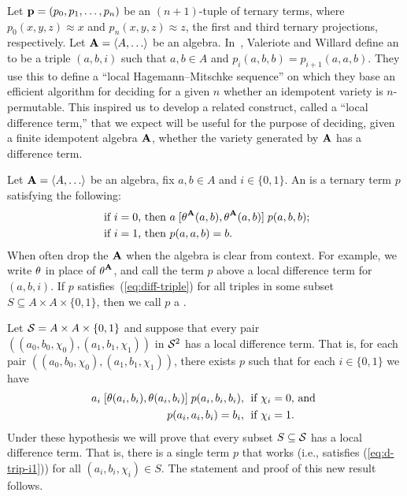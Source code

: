 Let $\mathbf{p} = (p_0, p_1, \dots, p_n)$ be an $(n+1)$-tuple of ternary terms, where
$p_0(x,y,z) \approx x$ and $p_n(x,y,z) \approx z$, the first and third
ternary projections, respectively. 
Let $\bA=\< A, \dots\>$ be an algebra.
In~\cite{MR3239624},
Valeriote and Willard define an 
to be a triple $(a,b,i)$ such that $a, b \in A$ and
$p_i(a,b,b) = p_{i+1}(a,a,b)$. They use this to define 
a ``local Hagemann–Mitschke sequence'' on which they base an efficient algorithm
for deciding for a given $n$ whether an idempotent variety is $n$-permutable.
This inspired us to develop a related construct, called
a ``local difference term,'' that we expect will be useful for the
purpose of deciding, given a finite idempotent algebra $\mathbf{A}$, whether the variety
generated by $\mathbf{A}$ has a difference term.

Let $\bA=\< A, \dots\>$ be an algebra, fix $a, b \in A$ and
$i \in \{0,1\}$.
An
 is a ternary term $p$ satisfying the following:
\begin{align}
\text{ if $i=0$, then } & a \comm{\Cg^{\bA}(a,b)}{\Cg^{\bA}(a,b)} p(a,b,b); \label{eq:diff-triple}\\
\text{ if $i=1$, then } &p(a,a,b) = b. \nonumber
\end{align}
When often drop the
$\mathbf{A}$ when the algebra is clear from context.
For example, we write $\operatorname{\theta}$ in place of $\operatorname{\theta}^{\mathbf{A}}$, and 
call the term $p$ above a local difference term for 
$(a,b,i)$.
If $p$ satisfies~(\ref{eq:diff-triple}) for all triples
in some subset $S\subseteq A \times A \times \{0,1\}$, then we call $p$
a .

Let 
$\mathcal{S} = A \times A \times \{0,1\}$ and
suppose that every pair
$((a_0, b_0, \chi_0), (a_1, b_1, \chi_1))$
in $\mathcal{S}^2$ has a local difference term.
That is, for each pair $((a_0, b_0, \chi_0), (a_1, b_1, \chi_1))$, there exists
$p$ such that for each $i \in \{0,1\}$ we have
\begin{align}
  a_i \comm{\Cg(a_i,b_i)}{\Cg(a_i,b_i)} p(a_i,b_i,b_i), & \;
  \text{ if $\chi_i=0$, and }  \label{eq:d-trip-i1}\\
  p(a_i,a_i,b_i) =b_i, & \;
  \text{ if $\chi_i=1$.}\nonumber
\end{align}
Under these hypothesis we will prove that every subset $S\subseteq \mathcal{S}$
has a local difference term.
That is, there is a single term $p$ that works (i.e., satisfies
(\ref{eq:d-trip-i1})) for all $(a_i, b_i, \chi_i) \in S$.
The statement and proof of this new result follows.

